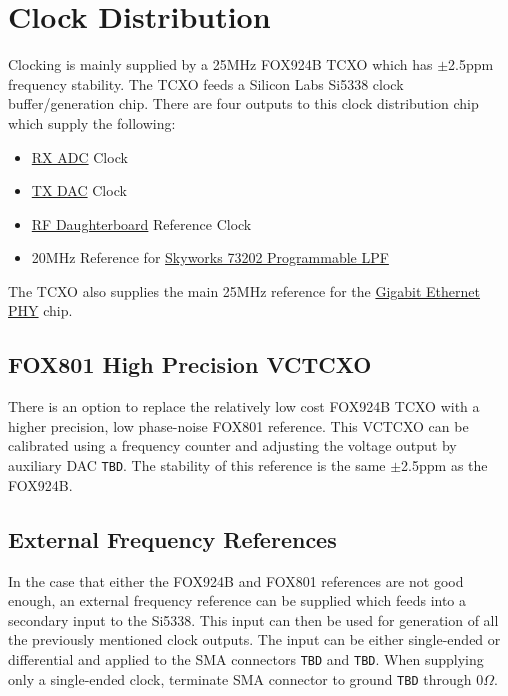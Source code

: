 \section{Clock Distribution} %
\label{sec:clock}

    Clocking is mainly supplied by a 25MHz FOX924B TCXO which has $\pm$2.5ppm frequency stability.
    The TCXO feeds a Silicon Labs Si5338 clock buffer/generation chip.  There are four outputs
    to this clock distribution chip which supply the following:
    
    \begin{itemize}
        \item \hyperref[sec:adc]{RX ADC} Clock
        \item \hyperref[sec:dac]{TX DAC} Clock
        \item \hyperref[sec:db]{RF Daughterboard} Reference Clock
        \item 20MHz Reference for \hyperref[sec:dac-lpf]{Skyworks 73202 Programmable LPF}
    \end{itemize}
    
    The TCXO also supplies the main 25MHz reference for the \hyperref[sec:gige]{Gigabit Ethernet PHY} chip.
        
    \subsection{FOX801 High Precision VCTCXO} %
        There is an option to replace the relatively low cost FOX924B TCXO with a higher precision,
        low phase-noise FOX801 reference.  This VCTCXO can be calibrated using a frequency counter
        and adjusting the voltage output by auxiliary DAC \texttt{TBD}.  The stability of this 
        reference is the same $\pm$2.5ppm as the FOX924B.
    
    \subsection{External Frequency References} %
        In the case that either the FOX924B and FOX801 references are not good enough, an external
        frequency reference can be supplied which feeds into a secondary input to the Si5338.
        This input can then be used for generation of all the previously mentioned clock outputs.
        The input can be either single-ended or differential and applied to the SMA connectors \texttt{TBD}
        and \texttt{TBD}.  When supplying only a single-ended clock, terminate SMA connector to 
        ground \texttt{TBD} through $0\Omega$.
    
